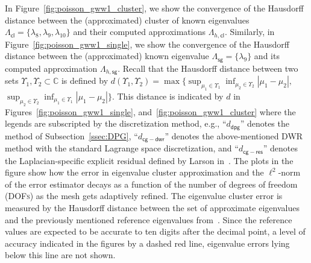 \documentclass[12pt, oneside, reqno]{amsart}
\theoremstyle{remark}
\begin{document}
In Figure~\ref{fig:poisson_gww1_cluster}, we show the convergence of the
Hausdorff distance between the (approximated) cluster of known
eigenvalues
\(\Lambda_\mathsf{cl} = \{\lambda_8, \lambda_9, \lambda_{10}\}\) and
their computed approximations \(\Lambda_{h,\mathsf{cl}}\).
Similarly, in Figure~\ref{fig:poisson_gww1_single}, we show the convergence of
the Hausdorff distance between the (approximated) known eigenvalue
\(\Lambda_\mathsf{sg} = \{\lambda_9\}\) and its computed
approximation \(\Lambda_{h,\mathsf{sg}}\).
Recall that the Hausdorff distance between two sets
\(\Upsilon_1, \Upsilon_2 \subset \mathbb{C}\) is defined by
$ d(\Upsilon_1, \Upsilon_2) = \max \{ \sup_{\mu_1 \in \Upsilon_1}
\inf_{\mu_2 \in \Upsilon_2} |\mu_1 - \mu_2|,$
$ \sup_{\mu_2 \in \Upsilon_2} \inf_{\mu_1 \in \Upsilon_1} |\mu_1 -
\mu_2| \}.  $ This distance is indicated by $d$ in
Figures~\ref{fig:poisson_gww1_single}, and~\ref{fig:poisson_gww1_cluster} where the 
legends are subscripted by the discretization method, 
e.g., ``$d_\mathsf{dpg}$'' denotes the method
of Subsection~\ref{ssec:DPG}, ``$d_{\mathsf{cg-dwr}}$'' denotes the
above-mentioned DWR method with the standard Lagrange space
discretization, and
``$d_{\mathsf{cg-res}}$'' denotes the Laplacian-specific explicit residual 
defined by Larson in~\cite{Lar2000-1}.
The plots in the figure show how the  error in eigenvalue cluster approximation
and the 
\(\ell^2\)-norm of the error estimator decays as a function of the
number of degrees of freedom (\textsc{DOFs}) as the mesh gets
adaptively refined.
The eigenvalue cluster error is measured by the Hausdorff distance
between the set of approximate eigenvalues and the previously
mentioned reference eigenvalues from~\cite{Dri1997-1}.  Since the
reference values are expected to be accurate to ten digits after the
decimal point, a level of accuracy indicated in the figures by a
dashed red line, eigenvalue errors lying below this line are not
shown.
\end{document}
